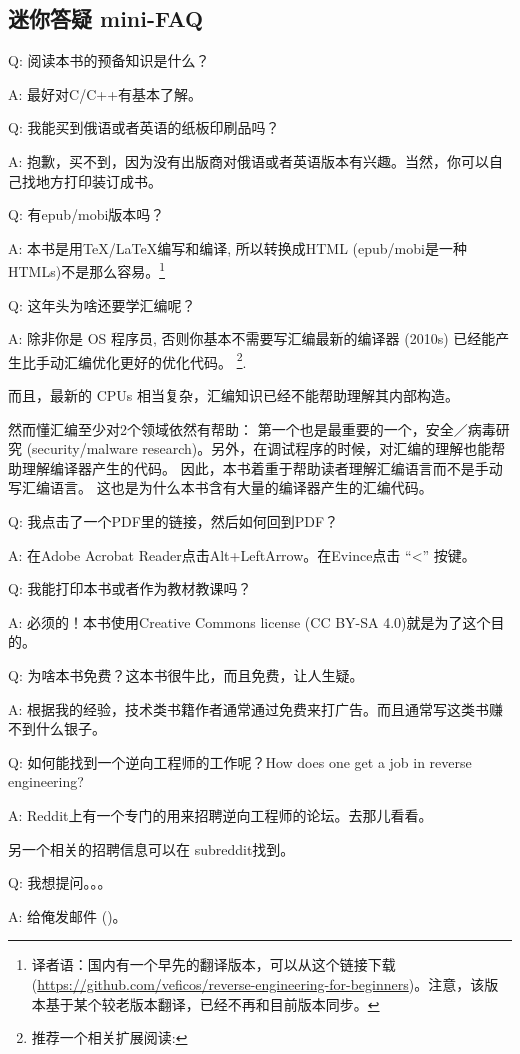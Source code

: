\documentclass[UTF8,nofonts]{ctexart}
\begin{document}

\subsection*{迷你答疑 mini-FAQ}


\par Q: 阅读本书的预备知识是什么？
\par A: 最好对C/C++有基本了解。
\par Q: 我能买到俄语或者英语的纸板印刷品吗？
\par A: 抱歉，买不到，因为没有出版商对俄语或者英语版本有兴趣。当然，你可以自己找地方打印装订成书。

\par Q: 有epub/mobi版本吗？
\par A: 本书是用TeX/LaTeX编写和编译, 所以转换成HTML (epub/mobi是一种HTMLs)不是那么容易。\footnote{译者语：国内有一个早先的翻译版本，可以从这个链接下载 (\url{https://github.com/veficos/reverse-engineering-for-beginners})。注意，该版本基于某个较老版本翻译，已经不再和目前版本同步。}


\par Q: 这年头为啥还要学汇编呢？
\par A: 除非你是 \ac{OS} 程序员, 否则你基本不需要写汇编\textemdash{}最新的编译器 (2010s) 已经能产生比手动汇编优化更好的优化代码。 \footnote{推荐一个相关扩展阅读: \InSqBrackets{\AgnerFog}}.

而且，最新的 \ac{CPU}s 相当复杂，汇编知识已经不能帮助理解其内部构造。

然而懂汇编至少对2个领域依然有帮助：
第一个也是最重要的一个，安全／病毒研究 (security/malware research)。另外，在调试程序的时候，对汇编的理解也能帮助理解编译器产生的代码。
因此，本书着重于帮助读者理解汇编语言而不是手动写汇编语言。
这也是为什么本书含有大量的编译器产生的汇编代码。

\par Q: 我点击了一个PDF里的链接，然后如何回到PDF？
\par A: 在Adobe Acrobat Reader点击Alt+LeftArrow。在Evince点击 ``<'' 按键。

\par Q: 我能打印本书或者作为教材教课吗？
\par A: 必须的！本书使用Creative Commons license (CC BY-SA 4.0)就是为了这个目的。

\par Q: 为啥本书免费？这本书很牛比，而且免费，让人生疑。
\par A:  根据我的经验，技术类书籍作者通常通过免费来打广告。而且通常写这类书赚不到什么银子。

\par Q: 如何能找到一个逆向工程师的工作呢？How does one get a job in reverse engineering?
\par A: Reddit上有一个专门的用来招聘逆向工程师的论坛\FNURLREDDIT{}。去那儿看看。

另一个相关的招聘信息可以在 subreddit找到。


\par Q: 我想提问。。。
\par A: 给俺发邮件 (\EMAIL)。
\end{document}
